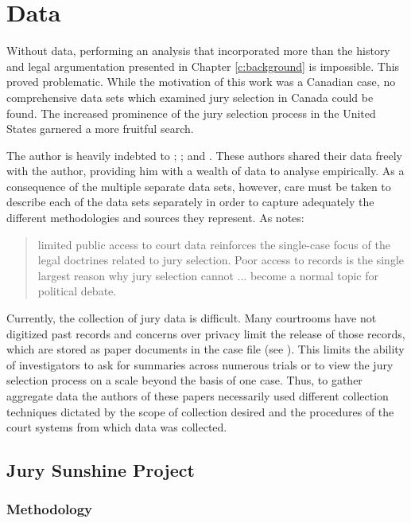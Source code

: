 \chapter{Data} \label{c:data}

Without data, performing an analysis that incorporated more than the history and legal argumentation presented in Chapter
\ref{c:background} is impossible. This proved problematic. While the motivation of this work was a Canadian case, no comprehensive
data sets which examined jury selection in Canada could be found. The increased prominence of the jury selection process
in the United States garnered a more fruitful search.

The author is heavily indebted to \citeauthor{JurySunshineProj}; \citeauthor{StubbornLegacy}; and
\citeauthor{PerempChalMurder}. These authors shared their data freely with the author, providing him with a wealth of data to
analyse empirically. As a consequence of the multiple separate data sets, however, care must be taken to describe each of the data
sets separately in order to capture adequately the different methodologies and sources they represent. As \cite{JurySunshineProj}
notes:

\begin{quote}
   limited public access to court data reinforces the single-case focus of the legal doctrines related to jury selection. Poor
   access to records is the single largest reason why jury selection
   cannot ... become a
   normal topic for political debate.
\end{quote}

Currently, the collection of jury data is difficult. Many courtrooms have not digitized past records and concerns over privacy
limit the release of those records, which are stored as paper documents in the case file (see \cite{JurySunshineProj}). This
limits the ability of investigators to ask for summaries across numerous trials or to view the jury selection process on a scale
beyond the basis of one case. Thus, to gather aggregate data the authors of these papers necessarily used different collection
techniques dictated by the scope of collection desired and the procedures of the court systems from which data was collected.

\section{Jury Sunshine Project} \label{sec:jspdata}

\subsection{Methodology}

